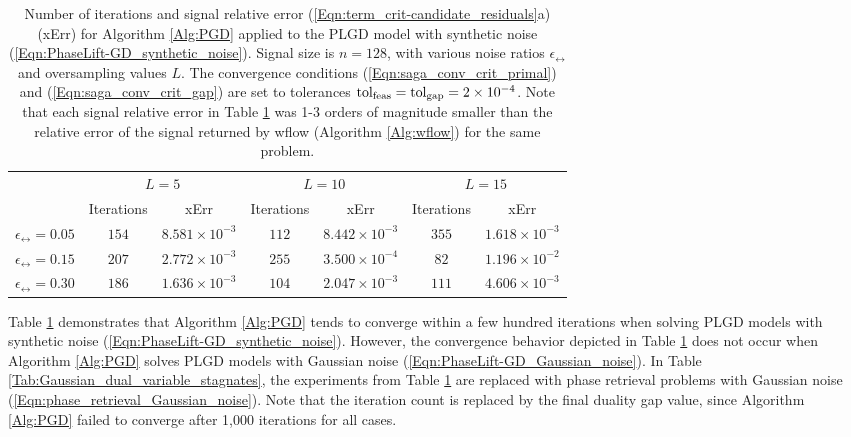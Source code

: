 \begin{enumerate}
\begin{table}[H]
\centering
\begin{tabular}{ |c|cc|cc|cc| }
 \hline

 	&	\multicolumn{2}{c|}{$L = 5$}
 		&	\multicolumn{2}{c|}{$L = 10$}
 			&	\multicolumn{2}{c|}{$L = 15$}	\\
 	&	 Iterations	&	xErr
 		&	Iterations	&	xErr
 			&	Iterations	&	xErr		\\  			
 \hline
$\epsilon_\rel = 0.05$
	&	$154$ & $8.581 \times 10^{-3}$
		&	$112$ & $8.442 \times 10^{-3}$
			&	$355$ & $ 1.618 \times 10^{-3}$ \\
$\epsilon_\rel = 0.15$
	&	$207$ & $2.772 \times 10^{-3}$
		&	$255$ & $3.500 \times 10^{-4}$
			&	$82$ & $1.196 \times 10^{-2} $ \\
$\epsilon_\rel = 0.30$
	&	$186$ & $1.636 \times 10^{-3}$
		&	$104$ & $2.047 \times 10^{-3}$
			&	$111$ & $4.606 \times 10^{-3}$ \\
 \hline
\end{tabular}
\caption{Number of iterations and signal relative error (\ref{Eqn:term_crit-candidate_residuals}a) (xErr) for Algorithm \ref{Alg:PGD} applied to the PLGD model with synthetic noise (\ref{Eqn:PhaseLift-GD_synthetic_noise}).  Signal size is $n=128$, with various noise ratios $\epsilon_\rel$ and oversampling values $L$.  The convergence conditions (\ref{Eqn:saga_conv_crit_primal}) and (\ref{Eqn:saga_conv_crit_gap}) are set to tolerances $\textnormal{tol}_\textnormal{feas} = \textnormal{tol}_\textnormal{gap} = 2 \times 10^{-4}$.  Note that each signal relative error in Table \ref{Tab:synthetic_dual_variable_converges} was 1-3 orders of magnitude smaller than the relative error of the signal returned by wflow (Algorithm \ref{Alg:wflow}) for the same problem.} 
\label{Tab:synthetic_dual_variable_converges}
\end{table}


Table \ref{Tab:synthetic_dual_variable_converges} demonstrates that Algorithm \ref{Alg:PGD} tends to converge within a few hundred iterations when solving PLGD models with synthetic noise (\ref{Eqn:PhaseLift-GD_synthetic_noise}).  However, the convergence behavior depicted in Table \ref{Tab:synthetic_dual_variable_converges} does not occur when Algorithm \ref{Alg:PGD} solves PLGD models with Gaussian noise (\ref{Eqn:PhaseLift-GD_Gaussian_noise}).  In Table \ref{Tab:Gaussian_dual_variable_stagnates}, the experiments from Table \ref{Tab:synthetic_dual_variable_converges} are replaced with phase retrieval problems with Gaussian noise (\ref{Eqn:phase_retrieval_Gaussian_noise}).  Note that the iteration count is replaced by the final duality gap value, since Algorithm \ref{Alg:PGD} failed to converge after 1,000 iterations for all cases.



\end{enumerate}
